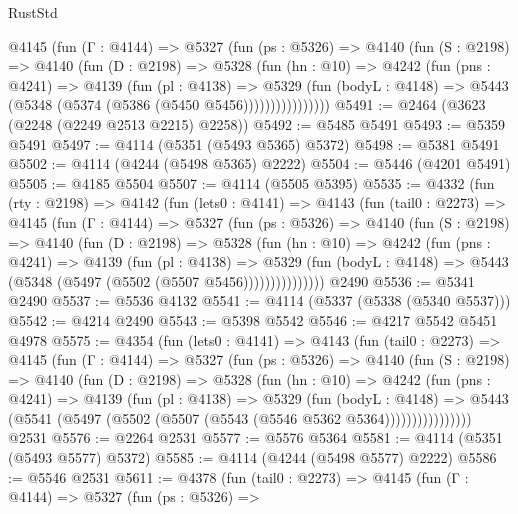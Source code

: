 \begin{lexlean}{RustStd}
\begin{coremodule}
{\begin{coremodule}
{{{{{{{{{{{{{{          @4145
            (fun (Γ : @4144) =>
            @5327
              (fun (ps : @5326) =>
              @4140
                (fun (S : @2198) =>
                @4140
                  (fun (D : @2198) =>
                  @5328
                    (fun (hn : @10) =>
                    @4242
                      (fun (pns : @4241) =>
                      @4139
                        (fun (pl : @4138) =>
                        @5329
                          (fun (bodyL : @4148) =>
                          @5443 (@5348 (@5374 (@5386 (@5450 @5456))))))))))))))))
@5491 := @2464 (@3623 (@2248 (@2249 @2513 @2215) @2258))
@5492 := @5485 @5491
@5493 := @5359 @5491
@5497 := @4114 (@5351 (@5493 @5365) @5372)
@5498 := @5381 @5491
@5502 := @4114 (@4244 (@5498 @5365) @2222)
@5504 := @5446 (@4201 @5491)
@5505 := @4185 @5504
@5507 := @4114 (@5505 @5395)
@5535 := @4332
    (fun (rty : @2198) =>
    @4142
      (fun (lets0 : @4141) =>
      @4143
        (fun (tail0 : @2273) =>
        @4145
          (fun (Γ : @4144) =>
          @5327
            (fun (ps : @5326) =>
            @4140
              (fun (S : @2198) =>
              @4140
                (fun (D : @2198) =>
                @5328
                  (fun (hn : @10) =>
                  @4242
                    (fun (pns : @4241) =>
                    @4139
                      (fun (pl : @4138) =>
                      @5329
                        (fun (bodyL : @4148) =>
                        @5443 (@5348 (@5497 (@5502 (@5507 @5456)))))))))))))))
    @2490
@5536 := @5341 @2490
@5537 := @5536 @4132
@5541 := @4114 (@5337 (@5338 (@5340 @5537)))
@5542 := @4214 @2490
@5543 := @5398 @5542
@5546 := @4217 @5542 @5451 @4978
@5575 := @4354
    (fun (lets0 : @4141) =>
    @4143
      (fun (tail0 : @2273) =>
      @4145
        (fun (Γ : @4144) =>
        @5327
          (fun (ps : @5326) =>
          @4140
            (fun (S : @2198) =>
            @4140
              (fun (D : @2198) =>
              @5328
                (fun (hn : @10) =>
                @4242
                  (fun (pns : @4241) =>
                  @4139
                    (fun (pl : @4138) =>
                    @5329
                      (fun (bodyL : @4148) =>
                      @5443 (@5541 (@5497 (@5502 (@5507 (@5543 (@5546 @5362 @5364))))))))))))))))
    @2531
@5576 := @2264 @2531
@5577 := @5576 @5364
@5581 := @4114 (@5351 (@5493 @5577) @5372)
@5585 := @4114 (@4244 (@5498 @5577) @2222)
@5586 := @5546 @2531
@5611 := @4378
    (fun (tail0 : @2273) =>
    @4145
      (fun (Γ : @4144) =>
      @5327
        (fun (ps : @5326) =>
}}}}}}}}}}}}}}
\end{coremodule}}
\end{coremodule}
\end{lexlean}
